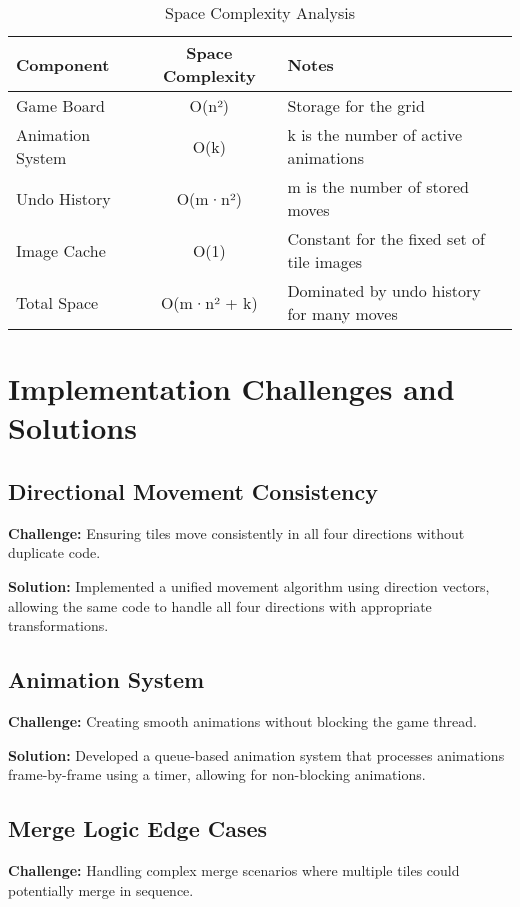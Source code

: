\documentclass[12pt, a4paper]{article}
\begin{document}
\begin{table}[h]
\centering
\caption{Space Complexity Analysis}
\begin{tabular}{|l|c|l|}
\hline
\textbf{Component} & \textbf{Space Complexity} & \textbf{Notes} \\
\hline
Game Board & O(n²) & Storage for the grid \\
\hline
Animation System & O(k) & k is the number of active animations \\
\hline
Undo History & O(m·n²) & m is the number of stored moves \\
\hline
Image Cache & O(1) & Constant for the fixed set of tile images \\
\hline
Total Space & O(m·n² + k) & Dominated by undo history for many moves \\
\hline
\end{tabular}
\end{table}



\section{Implementation Challenges and Solutions}

\subsection{Directional Movement Consistency}
\textbf{Challenge:} Ensuring tiles move consistently in all four directions without duplicate code.

\textbf{Solution:} Implemented a unified movement algorithm using direction vectors, allowing the same code to handle all four directions with appropriate transformations.

\subsection{Animation System}
\textbf{Challenge:} Creating smooth animations without blocking the game thread.

\textbf{Solution:} Developed a queue-based animation system that processes animations frame-by-frame using a timer, allowing for non-blocking animations.

\subsection{Merge Logic Edge Cases}
\textbf{Challenge:} Handling complex merge scenarios where multiple tiles could potentially merge in sequence.
\end{document}
